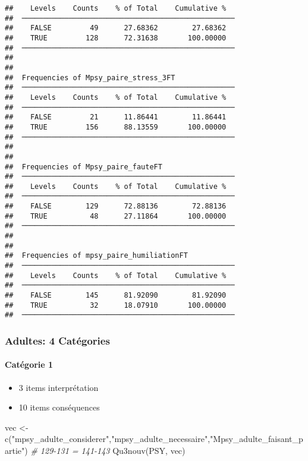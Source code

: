 \documentclass[
]{article}
\newenvironment{Shaded}{\begin{snugshade}}{\end{snugshade}}
\newcommand{\CommentTok}[1]{\textcolor[rgb]{0.56,0.35,0.01}{\textit{#1}}}
\newcommand{\FunctionTok}[1]{\textcolor[rgb]{0.00,0.00,0.00}{#1}}
\newcommand{\NormalTok}[1]{#1}
\newcommand{\OtherTok}[1]{\textcolor[rgb]{0.56,0.35,0.01}{#1}}
\newcommand{\StringTok}[1]{\textcolor[rgb]{0.31,0.60,0.02}{#1}}
\providecommand{\tightlist}{%
  \setlength{\itemsep}{0pt}\setlength{\parskip}{0pt}}
\begin{document}
\begin{verbatim}
##    Levels    Counts    % of Total    Cumulative %   
##  ────────────────────────────────────────────────── 
##    FALSE         49      27.68362        27.68362   
##    TRUE         128      72.31638       100.00000   
##  ────────────────────────────────────────────────── 
## 
## 
##  Frequencies of Mpsy_paire_stress_3FT               
##  ────────────────────────────────────────────────── 
##    Levels    Counts    % of Total    Cumulative %   
##  ────────────────────────────────────────────────── 
##    FALSE         21      11.86441        11.86441   
##    TRUE         156      88.13559       100.00000   
##  ────────────────────────────────────────────────── 
## 
## 
##  Frequencies of Mpsy_paire_fauteFT                  
##  ────────────────────────────────────────────────── 
##    Levels    Counts    % of Total    Cumulative %   
##  ────────────────────────────────────────────────── 
##    FALSE        129      72.88136        72.88136   
##    TRUE          48      27.11864       100.00000   
##  ────────────────────────────────────────────────── 
## 
## 
##  Frequencies of mpsy_paire_humiliationFT            
##  ────────────────────────────────────────────────── 
##    Levels    Counts    % of Total    Cumulative %   
##  ────────────────────────────────────────────────── 
##    FALSE        145      81.92090        81.92090   
##    TRUE          32      18.07910       100.00000   
##  ──────────────────────────────────────────────────
\end{verbatim}

\hypertarget{adultes-4-catuxe9gories}{%
\subsubsection{Adultes: 4 Catégories}\label{adultes-4-catuxe9gories}}

\hypertarget{catuxe9gorie-1-1}{%
\paragraph{Catégorie 1}\label{catuxe9gorie-1-1}}

\begin{itemize}
\tightlist
\item
  3 items interprétation
\item
  10 items conséquences
\end{itemize}

\begin{Shaded}
\begin{Highlighting}[]
\NormalTok{vec }\OtherTok{\textless{}{-}} \FunctionTok{c}\NormalTok{(}\StringTok{"mpsy\_adulte\_considerer"}\NormalTok{,}\StringTok{"mpsy\_adulte\_necessaire"}\NormalTok{,}\StringTok{"Mpsy\_adulte\_faisant\_partie"}\NormalTok{)  }\CommentTok{\# 129{-}131 = 141{-}143}
\FunctionTok{Qu3nouv}\NormalTok{(PSY, vec)}
\end{Highlighting}
\end{Shaded}
\end{document}
